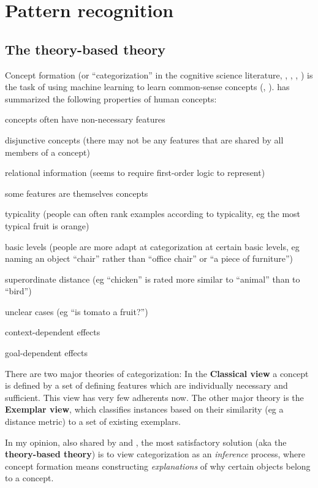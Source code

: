 \documentclass[a4paper]{report}
\begin{document}
\chapter{Pattern recognition}
\minitoc

\section{The theory-based theory}

Concept formation (or ``categorization'' in the cognitive science literature, \citep*{Murphy2002}, \citep*{Cohen2005}, \citep*{Margolis1999}, \citep*{Lakoff1987}) is the task of using machine learning to learn common-sense concepts (\citep*{Nakamura1993}, \citep*{Wrobel1994}).  \citep*{Wrobel1994} has summarized the following properties of human concepts:
\begin{compactenum}[1.]
\item concepts often have non-necessary features
\item disjunctive concepts (there may not be any features that are shared by all members of a concept)
\item relational information (seems to require first-order logic to represent)
\item some features are themselves concepts
\item typicality (people can often rank examples according to typicality, eg the most typical fruit is orange)
\item basic levels (people are more adapt at categorization at certain basic levels, eg naming an object ``chair'' rather than ``office chair'' or ``a piece of furniture'')
\item superordinate distance (eg ``chicken'' is rated more similar to ``animal'' than to ``bird'')
\item unclear cases (eg ``is tomato a fruit?'')
\item context-dependent effects
\item goal-dependent effects
\end{compactenum}

There are two major theories of categorization:  In the \textbf{Classical view} a concept is defined by a set of defining features which are individually necessary and sufficient.  This view has very few adherents now.  The other major theory is the \textbf{Exemplar view}, which classifies instances based on their similarity (eg a distance metric) to a set of existing exemplars.

In my opinion, also shared by \citep*{Murphy1985} and \citep*{Wrobel1994}, the most satisfactory solution (aka the \textbf{theory-based theory}) is to view categorization as an \textit{inference} process, where concept formation means constructing \textit{explanations} of why certain objects belong to a concept.
\end{document}
